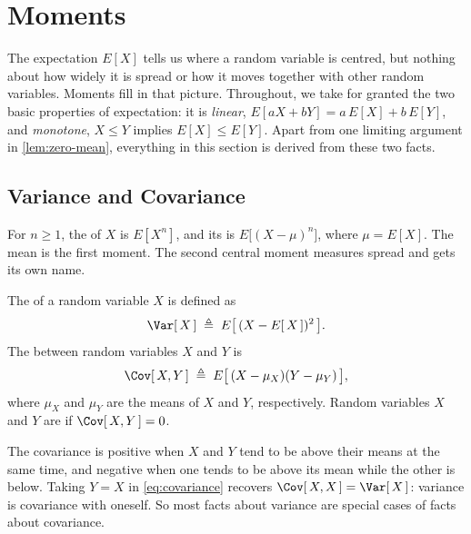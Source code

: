 \section{Moments}\label{sec:moments}


\suppstart
The expectation $E[X]$ tells us where a random variable is centred, but nothing about how widely it is spread or how it moves together with other random variables.
Moments fill in that picture.
Throughout, we take for granted the two basic properties of expectation:
it is \emph{linear}, $E[aX+bY]=a\,E[X]+b\,E[Y]$, and \emph{monotone}, $X\le Y$ implies $E[X]\le E[Y]$.
Apart from one limiting argument in \autoref{lem:zero-mean}, everything in this section is derived from these two facts.

\subsection{Variance and Covariance}

For $n\ge1$, the  of $X$ is $E[X^{n}]$, and its  is $E\bigl[(X-\mu)^{n}\bigr]$, where $\mu=E[X]$.
The mean is the first moment.
The second central moment measures spread and gets its own name.
\suppend

\begin{definition}
	The  of a random variable $X$ is defined as
	\begin{equation}
		\Var[\,X\,] \;\triangleq\; E\bigl[\,(X-E[\,X\,])^{2}\,\bigr] . \label{eq:variance}
	\end{equation}
	The  between random variables $X$ and $Y$ is
	\begin{equation}
		\Cov[\,X,Y\,] \;\triangleq\; E\bigl[\,(X-\mu_{X})(Y-\mu_{Y})\,\bigr] , \label{eq:covariance}
	\end{equation}
	where $\mu_{X}$ and $\mu_{Y}$ are the means of $X$ and $Y$, respectively.
	Random variables $X$ and $Y$ are  if $\Cov[\,X,Y\,]=0$.
\end{definition}

\suppstart
The covariance is positive when $X$ and $Y$ tend to be above their means at the same time, and negative when one tends to be above its mean while the other is below.
Taking $Y=X$ in \eqref{eq:covariance} recovers $\Cov[\,X,X\,]=\Var[\,X\,]$: variance is covariance with oneself.
So most facts about variance are special cases of facts about covariance.


